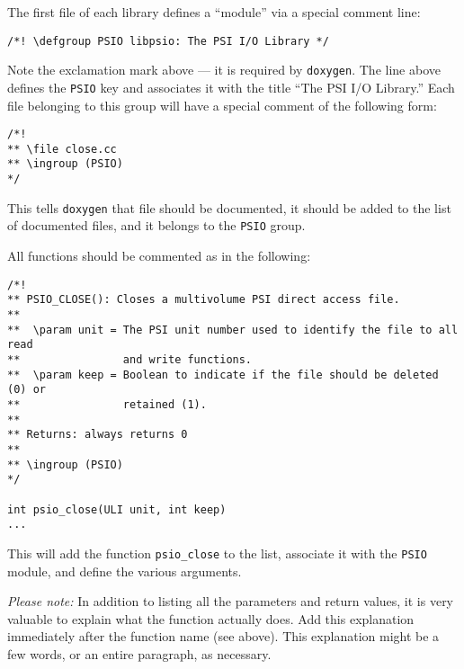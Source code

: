 The first file of each library defines a ``module'' via a special
comment line:
\begin{verbatim}
/*! \defgroup PSIO libpsio: The PSI I/O Library */
\end{verbatim}
Note the exclamation mark above --- it is required by {\tt doxygen}.
The line above defines the {\tt PSIO} key and associates it with the
title ``The PSI I/O Library.'' Each file belonging to this group will
have a special comment of the following form:
\begin{verbatim}
/*!
** \file close.cc
** \ingroup (PSIO)
*/
\end{verbatim}
This tells {\tt doxygen} that file  should be
documented, it should be added to the list of documented files, and it
belongs to the {\tt PSIO} group.

All functions should be commented as in the following:
\begin{verbatim}
/*!
** PSIO_CLOSE(): Closes a multivolume PSI direct access file.
**
**  \param unit = The PSI unit number used to identify the file to all read
**                and write functions.
**  \param keep = Boolean to indicate if the file should be deleted (0) or
**                retained (1).
**
** Returns: always returns 0
**
** \ingroup (PSIO)
*/

int psio_close(ULI unit, int keep)
...
\end{verbatim}
This will add the function {\tt psio\_close} to the list, associate it with
the {\tt PSIO} module, and define the various arguments.

{\em Please note:} In addition to listing all the parameters and return
values, it is very valuable to explain what the function actually does.
Add this explanation immediately after the function name (see above).  This
explanation might be a few words, or an entire paragraph, as necessary.

